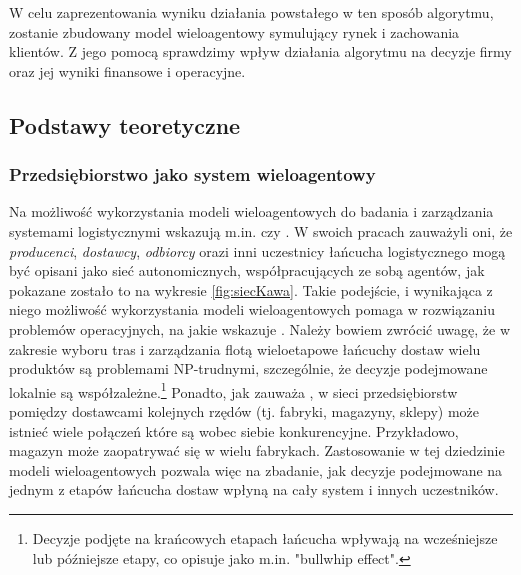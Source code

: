 \documentclass[polish, twoside, 12pt, a4paper]{article}
\theoremstyle{definition}
\theoremstyle{plain}
\theoremstyle{remark}
\begin{document}
W celu zaprezentowania wyniku działania powstałego w ten sposób algorytmu, zostanie zbudowany model wieloagentowy symulujący rynek i zachowania klientów. Z jego pomocą sprawdzimy wpływ działania algorytmu na decyzje firmy oraz jej wyniki finansowe i operacyjne.

\subsection{Podstawy teoretyczne} \label{chapter:teoria}
\subsubsection{Przedsiębiorstwo jako system wieloagentowy} 
Na możliwość wykorzystania modeli wieloagentowych do badania i zarządzania systemami logistycznymi wskazują m.in. \cite{Moyaux2006} czy \cite{Kawa2010}. W swoich pracach zauważyli oni, że  \textit{producenci},  \textit{dostawcy},  \textit{odbiorcy} orazi inni uczestnicy łańcucha logistycznego mogą być opisani jako sieć autonomicznych, współpracujących ze sobą agentów, jak pokazane zostało to na wykresie \ref{fig:siecKawa}. Takie podejście, i wynikająca z niego możliwość wykorzystania modeli wieloagentowych pomaga w rozwiązaniu problemów operacyjnych, na jakie wskazuje \cite{Kawa2010}. Należy bowiem zwrócić uwagę, że w zakresie wyboru tras i zarządzania flotą wieloetapowe łańcuchy dostaw wielu produktów są problemami NP-trudnymi, szczególnie, że decyzje podejmowane lokalnie są współzależne.\footnote{Decyzje podjęte na krańcowych etapach łańcucha wpływają na wcześniejsze lub późniejsze etapy, co \cite{Moyaux2006} opisuje jako m.in. "bullwhip effect".} Ponadto, jak zauważa \cite{Kawa2010}, w sieci przedsiębiorstw pomiędzy dostawcami kolejnych rzędów (tj. fabryki, magazyny, sklepy) może istnieć wiele połączeń które są wobec siebie konkurencyjne. Przykładowo, magazyn może zaopatrywać się w wielu fabrykach. Zastosowanie w tej dziedzinie modeli wieloagentowych pozwala więc na zbadanie, jak decyzje podejmowane na jednym z etapów łańcucha dostaw wpłyną na cały system i innych uczestników.  
\end{document}
